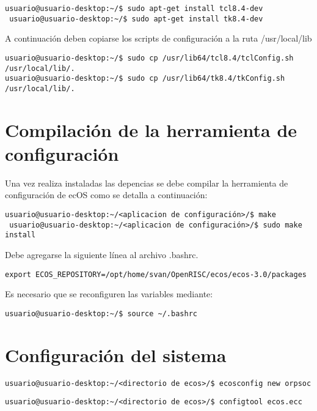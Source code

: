 \begin{lstlisting}[breaklines]
 usuario@usuario-desktop:~/$ sudo apt-get install tcl8.4-dev
 usuario@usuario-desktop:~/$ sudo apt-get install tk8.4-dev
\end{lstlisting}

A continuación deben copiarse los scripts de configuración a la ruta /usr/local/lib

\begin{lstlisting}[breaklines]
usuario@usuario-desktop:~/$ sudo cp /usr/lib64/tcl8.4/tclConfig.sh /usr/local/lib/.
usuario@usuario-desktop:~/$ sudo cp /usr/lib64/tk8.4/tkConfig.sh /usr/local/lib/.
\end{lstlisting}


\section{Compilación de la herramienta de configuración}

Una vez realiza instaladas las depencias se debe compilar la herramienta de configuración de ecOS como se detalla a continuación: 

\begin{lstlisting}[breaklines]
 usuario@usuario-desktop:~/<aplicacion de configuración>/$ make
 usuario@usuario-desktop:~/<aplicacion de configuración>/$ sudo make install
\end{lstlisting}

Debe agregarse la siguiente línea al archivo .bashrc.

\begin{lstlisting}[breaklines]
export ECOS_REPOSITORY=/opt/home/svan/OpenRISC/ecos/ecos-3.0/packages
\end{lstlisting}

Es necesario que se reconfiguren las variables mediante:
\begin{lstlisting}[breaklines]
 usuario@usuario-desktop:~/$ source ~/.bashrc
\end{lstlisting}

\section{Configuración del sistema}

\begin{lstlisting}[breaklines]
 usuario@usuario-desktop:~/<directorio de ecos>/$ ecosconfig new orpsoc 
\end{lstlisting}

\begin{lstlisting}[breaklines]
usuario@usuario-desktop:~/<directorio de ecos>/$ configtool ecos.ecc
\end{lstlisting}

